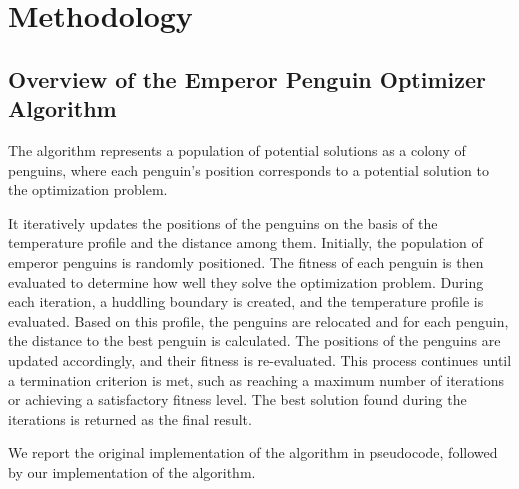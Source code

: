 \section{Methodology}

\subsection{Overview of the Emperor Penguin Optimizer Algorithm}

The algorithm represents a population of potential solutions as a colony of penguins, where each penguin's position corresponds to a potential solution to the optimization problem. 

It iteratively updates the positions of the penguins on the basis of the temperature profile and the distance among them. 
Initially, the population of emperor penguins is randomly positioned. 
The fitness of each penguin is then evaluated to determine how well they solve the optimization problem. 
During each iteration, a huddling boundary is created, and the temperature profile is evaluated. 
Based on this profile, the penguins are relocated and for each penguin, the distance to the best penguin is calculated. The positions of the penguins are updated accordingly, 
and their fitness is re-evaluated. This process continues until a termination criterion is met, 
such as reaching a maximum number of iterations or achieving a satisfactory fitness level. The best solution found during the iterations is returned as the final result. 

We report the original implementation of the algorithm in pseudocode, followed by our implementation of the algorithm.

